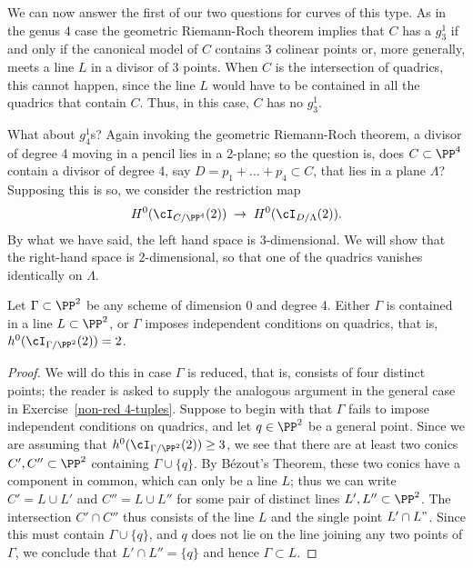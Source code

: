 We can now answer the first of our two questions for curves of this type. As in the genus 4 case the geometric Riemann-Roch theorem implies that $C$ has a $g^1_3$ if and only if the canonical model of $C$ contains 3 colinear points or, more generally, meets a line $L$ in a divisor of 3 points. When $C$ is the intersection of quadrics, this cannot happen, since the line $L$ would have to be contained in all the quadrics that contain $C$. Thus, in this case, 
$C$ has no $g^1_3$.

What about $g^1_4$s? Again invoking the geometric Riemann-Roch theorem, a divisor of degree 4 moving in a pencil lies in a 2-plane; so the question is, does $C \subset \PP^4$ contain a divisor of degree 4, say $D = p_1+\dots +p_4 \subset C$, that lies in a plane $\Lambda$? Supposing this is so, we consider the restriction map
$$
H^0(\cI_{C/\PP^4}(2)) \; \to \; H^0(\cI_{D/\Lambda}(2)).
$$
By what we have said, the left hand space is 3-dimensional. We will show that the right-hand space
is 2-dimensional, so that one of the quadrics vanishes identically on $\Lambda$.

\begin{lemma}\label{4-tuples}
Let $\Gamma \subset \PP^2$ be any scheme of dimension 0 and degree 4. Either $\Gamma$ is contained in a line $L \subset \PP^2$, or $\Gamma$ imposes independent conditions on quadrics, that is, $h^0(\cI_{\Gamma /\PP^2}(2)) = 2$.
\end{lemma}

\begin{proof}
We will do this in case $\Gamma$ is reduced, that is, consists of four distinct points; the reader is asked to supply the analogous argument in the general case in Exercise~\ref{non-red 4-tuples}. Suppose to begin with that $\Gamma$ fails to impose independent conditions on quadrics, and let $q \in \PP^2$ be a general point. Since we are assuming that $h^0(\cI_{\Gamma /\PP^2}(2)) \geq 3$, we see that there are at least two conics $C', C'' \subset \PP^2$ containing $\Gamma \cup \{q\}$. By B\'ezout's Theorem, these two conics have a component in common, which can only be a line $L$; thus we can write $C' = L \cup L'$ and $C'' = L \cup L''$ for some pair of distinct lines $L', L'' \subset \PP^2$. The intersection $C' \cap C''$ thus consists of the line $L$ and the single point $L' \cap L"$. Since this must contain $\Gamma \cup \{q\}$, and $q$ does not lie on the line joining any two points of $\Gamma$, we conclude that $L' \cap L'' = \{q\}$ and hence $\Gamma \subset L$.
\end{proof}

